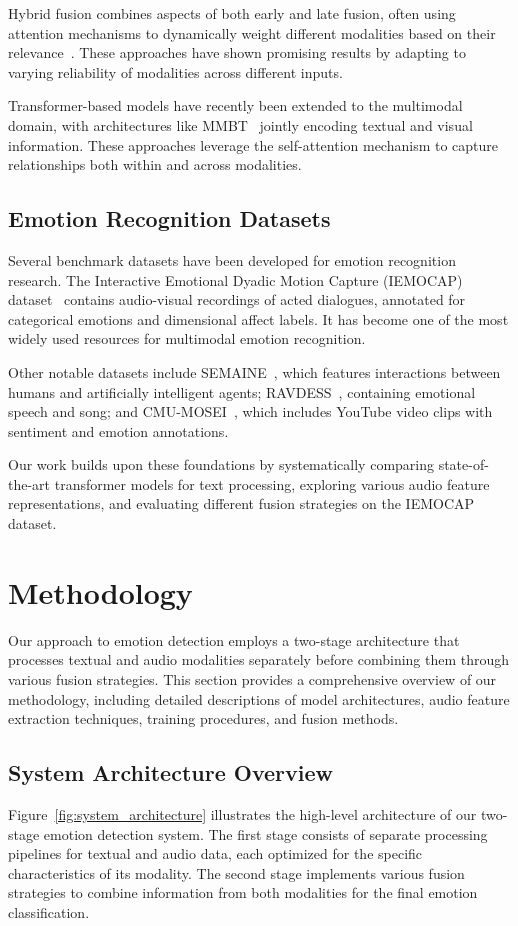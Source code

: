\documentclass[12pt]{article}
\begin{document}
Hybrid fusion combines aspects of both early and late fusion, often using attention mechanisms to dynamically weight different modalities based on their relevance~\cite{zadeh2018memory}. These approaches have shown promising results by adapting to varying reliability of modalities across different inputs.

Transformer-based models have recently been extended to the multimodal domain, with architectures like MMBT~\cite{kiela2019supervised} jointly encoding textual and visual information. These approaches leverage the self-attention mechanism to capture relationships both within and across modalities.

\subsection{Emotion Recognition Datasets}
Several benchmark datasets have been developed for emotion recognition research. The Interactive Emotional Dyadic Motion Capture (IEMOCAP) dataset~\cite{busso2008iemocap} contains audio-visual recordings of acted dialogues, annotated for categorical emotions and dimensional affect labels. It has become one of the most widely used resources for multimodal emotion recognition.

Other notable datasets include SEMAINE~\cite{mckeown2012semaine}, which features interactions between humans and artificially intelligent agents; RAVDESS~\cite{livingstone2018ryerson}, containing emotional speech and song; and CMU-MOSEI~\cite{zadeh2018multimodal}, which includes YouTube video clips with sentiment and emotion annotations.

Our work builds upon these foundations by systematically comparing state-of-the-art transformer models for text processing, exploring various audio feature representations, and evaluating different fusion strategies on the IEMOCAP dataset.

\section{Methodology}
\label{sec:methodology}
Our approach to emotion detection employs a two-stage architecture that processes textual and audio modalities separately before combining them through various fusion strategies. This section provides a comprehensive overview of our methodology, including detailed descriptions of model architectures, audio feature extraction techniques, training procedures, and fusion methods.

\subsection{System Architecture Overview}
Figure~\ref{fig:system_architecture} illustrates the high-level architecture of our two-stage emotion detection system. The first stage consists of separate processing pipelines for textual and audio data, each optimized for the specific characteristics of its modality. The second stage implements various fusion strategies to combine information from both modalities for the final emotion classification.
\end{document}
